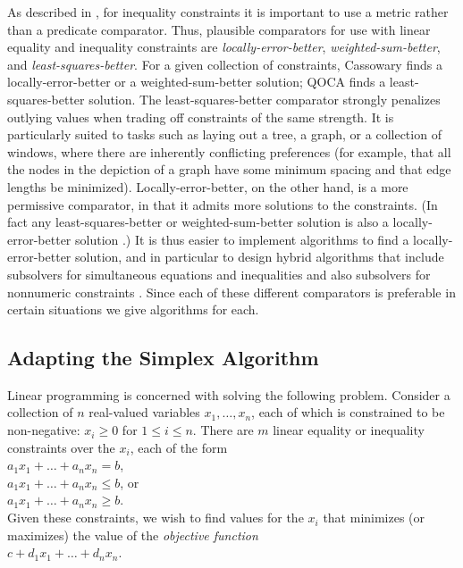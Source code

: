 \documentclass{article}
\begin{document}
As described in \cite{borning-uist-96},
for inequality constraints it is important to use a metric rather than a
predicate comparator.  Thus, plausible comparators for use with linear
equality and inequality constraints are {\em locally-error-better}, 
{\em weighted-sum-better}, and {\em least-squares-better}.  
For a given
collection of constraints, Cassowary finds a locally-error-better or a
weighted-sum-better solution; QOCA finds a least-squares-better solution.
The least-squares-better comparator strongly
penalizes outlying values when trading off constraints of the same
strength.  It is particularly suited to tasks such as laying out a tree, a
graph, or a collection of windows, where there are inherently conflicting
preferences (for example, that all the nodes in the depiction of a graph
have some minimum spacing and that edge lengths be minimized).
Locally-error-better, on the other hand, is a more permissive
comparator, in that it admits more solutions to the constraints.  (In fact
any least-squares-better or weighted-sum-better solution is also a
locally-error-better solution \cite{borning-lisp-symbolic-computation-92}.)
It is thus easier to implement algorithms to find a locally-error-better
solution, and in particular to design hybrid algorithms that include
subsolvers for simultaneous equations and inequalities and also subsolvers
for nonnumeric constraints \cite{borning-cp-95}.
Since each of these different comparators is preferable in certain
situations we  give algorithms for each.

\subsection{Adapting the Simplex Algorithm}

Linear programming is concerned with solving the following problem.  Consider
a collection of $n$ real-valued variables $x_1, \ldots, x_n$, each
of which  is constrained to be non-negative: 
$x_i \geq 0$ for $1 \leq i \leq n$.  There are  $m$
linear equality or inequality constraints over the $x_i$, each of the form \\
\hspace*{5mm}\mbox{$a_1 x_1 + \ldots + a_n x_n = b$},\\
\hspace*{5mm}\mbox{$a_1 x_1 + \ldots + a_n x_n \leq b$},  or\\
\hspace*{5mm}\mbox{$a_1 x_1 + \ldots + a_n x_n \geq b$}.\\
Given these constraints, we wish to find values for the $x_i$ that minimizes 
(or maximizes) the value of the {\em objective function} \\
\hspace*{5mm}$c + d_1 x_1 + \ldots + d_n x_n$. \\
\end{document}
